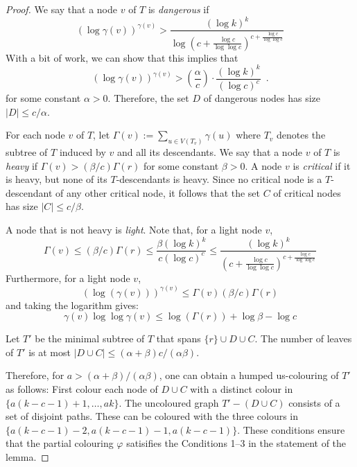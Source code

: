 \documentclass[kpfonts]{patmorin}
\begin{document}
\begin{proof}
    We say that a node $v$ of $T$ is \emph{dangerous} if
    \[
        (\log \gamma(v))^{\gamma(v)} > \frac{(\log k)^k}{\log\left(c+\frac{\log c}{\log\log c}\right)^{c+\frac{\log c}{\log\log c}}}
    \]
    With a bit of work, we can show that this implies that
    \[
        (\log \gamma(v))^{\gamma(v)} > \left(\frac{\alpha}{c}\right)\cdot
            \frac{(\log k)^k}{(\log c)^c} \enspace .
    \]
    for some constant $\alpha > 0$.  Therefore, the set $D$ of dangerous nodes has size $|D|\le c/\alpha$.

    For each node $v$ of $T$, let $\Gamma(v):=\sum_{u\in V(T_v)}\gamma(u)$ where $T_v$ denotes the subtree of $T$ induced by $v$ and all its descendants.  We say that a node $v$ of $T$ is \emph{heavy} if $\Gamma(v)> (\beta/c) \Gamma(r)$ for some constant $\beta>0$.   A node $v$ is \emph{critical} if it is heavy, but none of its $T$-descendants is heavy.  Since no critical node is a $T$-descendant of any other critical node, it follows that the set $C$ of critical nodes has size $|C|\le c/\beta$.

    A node that is not heavy is \emph{light}.  Note that, for a light node $v$,
    \[
        \Gamma(v) \le (\beta/c) \Gamma(r) \le \frac{\beta(\log k)^k}{c(\log c)^c} \le \frac{(\log k)^k}{\left(c+\frac{\log c}{\log\log c}\right)^{c+\frac{\log c}{\log\log c}}}
    \]
    Furthermore, for a light node $v$,
    \[
        (\log(\gamma(v)))^{\gamma(v)} \le \Gamma(v)  (\beta/c)\Gamma(r)
    \]
    and taking the logarithm gives:
    \[
        \gamma(v)\log\log\gamma(v) \le \log(\Gamma(r)) +\log\beta -\log c
    \]

    Let $T'$ be the minimal subtree of $T$ that spans $\{r\}\cup D\cup C$.  The number of leaves of $T'$ is at most $|D\cup C|\le (\alpha+\beta)c/(\alpha\beta)$.

    Therefore, for $a>(\alpha+\beta)/(\alpha\beta)$, one can obtain a humped us-colouring of $T'$ as follows:  First colour each node of $D\cup C$ with a distinct colour in $\{a(k-c-1)+1,\ldots,ak\}$.  The uncoloured graph $T'-(D\cup C)$ consists of a set of disjoint paths.  These can be coloured with the three colours in $\{a(k-c-1)-2,a(k-c-1)-1,a(k-c-1)\}$.  These conditions ensure that the partial colouring $\varphi$ satisifies the Conditions 1--3 in the statement of the lemma.


\end{proof}
\end{document}

